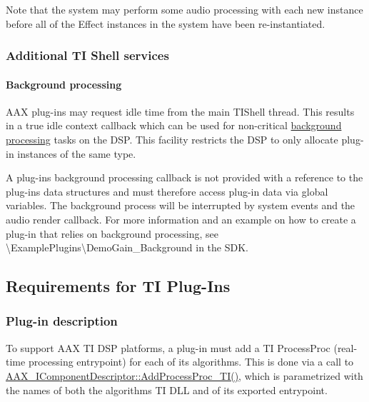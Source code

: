 Note that the system may perform some audio processing with each new instance before all of the Effect instances in the system have been re-\/instantiated.

\hypertarget{a00362_subsection__additional_ti_shell_services}{}\subsubsection{Additional T\+I Shell services}\label{a00362_subsection__additional_ti_shell_services}


\hypertarget{a00362_subsubsection__background_processing_}{}\paragraph{Background processing}\label{a00362_subsubsection__background_processing_}
 A\+A\+X plug-\/ins may request idle time from the main T\+I\+Shell thread. This results in a true idle context callback which can be used for non-\/critical \hyperlink{a00341}{background processing} tasks on the D\+S\+P. This facility restricts the D\+S\+P to only allocate plug-\/in instances of the same type.

A plug-\/in\textquotesingle{}s background processing callback is not provided with a reference to the plug-\/in\textquotesingle{}s data structures and must therefore access plug-\/in data via global variables. The background process will be interrupted by system events and the audio render callback. For more information and an example on how to create a plug-\/in that relies on background processing, see {\ttfamily \textbackslash{}Example\+Plugins\textbackslash{}Demo\+Gain\+\_\+\+Background} in the S\+D\+K. 

 \hypertarget{a00362_aax_ti_guide_03_requirements_for_ti_plug_ins}{}\subsection{Requirements for T\+I Plug-\/\+Ins}\label{a00362_aax_ti_guide_03_requirements_for_ti_plug_ins}
\hypertarget{a00362_subsection__plugin_description}{}\subsubsection{Plug-\/in description}\label{a00362_subsection__plugin_description}
To support A\+A\+X T\+I D\+S\+P platforms, a plug-\/in must add a T\+I Process\+Proc (real-\/time processing entrypoint) for each of its algorithms. This is done via a call to \hyperlink{a00088_aa8443e720e48046444a2e9f712f0864b}{A\+A\+X\+\_\+\+I\+Component\+Descriptor\+::\+Add\+Process\+Proc\+\_\+\+T\+I()}, which is parametrized with the names of both the algorithm\textquotesingle{}s T\+I D\+L\+L and of its exported entrypoint.

